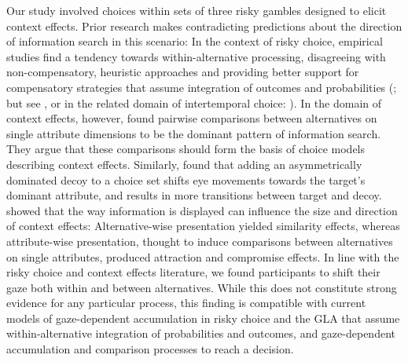\documentclass[11pt, a4paper]{article}
\begin{document}
Our study involved choices within sets of three risky gambles designed to elicit context effects. Prior research makes contradicting predictions about the direction of information search in this scenario: In the context of risky choice, empirical studies find a tendency towards within-alternative processing, disagreeing with non-compensatory, heuristic approaches and providing better support for compensatory strategies that assume integration of outcomes and probabilities (\cite{fiedler2012DynamicsDecisionMaking,glockner2011EyetrackingStudyInformation,johnson2008ProcessModelsDeserve}; but see \cite{russo1983StrategiesMultiattributeBinary, su2013MakingRiskyChoice}, or in the related domain of intertemporal choice: \cite{amasino2019AmountTimeExert}). In the domain of context effects, however, \textcite{noguchi2014AttractionCompromiseSimilarity} found pairwise comparisons between alternatives on single attribute dimensions to be the dominant pattern of information search. They argue that these comparisons should form the basis of choice models describing context effects. Similarly, \textcite{marini2020AttractionComesMany} found that adding an asymmetrically dominated decoy to a choice set shifts eye movements towards the target’s dominant attribute, and results in more transitions between target and decoy. \textcite{cataldo2019ComparisonProcessAccount} showed that the way information is displayed can influence the size and direction of context effects: Alternative-wise presentation yielded similarity effects, whereas attribute-wise presentation, thought to induce comparisons between alternatives on single attributes, produced attraction and compromise effects. In line with the risky choice and context effects literature, we found participants to shift their gaze both within and between alternatives. While this does not constitute strong evidence for any particular process, this finding is compatible with current models of gaze-dependent accumulation in risky choice \parencite{glickman2019FormationPreferenceRisky, smith2018AttentionChoiceDomains} and the GLA that assume within-alternative integration of probabilities and outcomes, and gaze-dependent accumulation and comparison processes to reach a decision.
\end{document}
